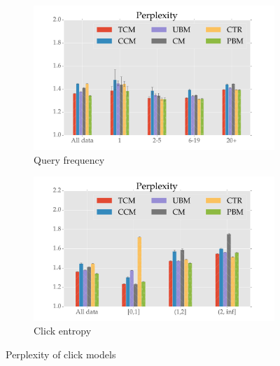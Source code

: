 \begin{figure}
	\centering
	\begin{subfigure}[b]{.49\textwidth}
		\centering
		\includegraphics[width=\textwidth]{figures/Perp_qf.pdf}
		\caption{Query frequency}
		\label{fig:perp_qf}
	\end{subfigure}
	\begin{subfigure}[b]{.49\textwidth}
		\centering
		\includegraphics[width=\textwidth]{figures/Perp_ce.pdf}
		\caption{Click entropy}
		\label{fig:perp_ce}
	\end{subfigure}
	\caption{Perplexity of click models}
\end{figure}

